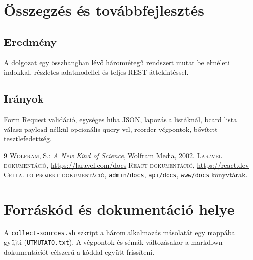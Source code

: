 \chapter{Összegzés és továbbfejlesztés}

\section{Eredmény}
A dolgozat egy összhangban lévő háromrétegű rendszert mutat be elméleti indokkal, részletes adatmodellel és teljes REST áttekintéssel.

\section{Irányok}
Form Request validáció, egységes hiba JSON, lapozás a listáknál, board lista válasz payload nélkül opcionális query-vel, reorder végpontok, bővített tesztlefedettség.

\begin{thebibliography}{9}
\textsc{Wolfram, S.}: \emph{A New Kind of Science}, Wolfram Media, 2002.
\textsc{Laravel dokumentáció}, \url{https://laravel.com/docs}
\textsc{React dokumentáció}, \url{https://react.dev}
\textsc{Cellauto projekt dokumentáció}, \texttt{admin/docs}, \texttt{api/docs}, \texttt{www/docs} könyvtárak.
\end{thebibliography}

\appendix
\chapter{Forráskód és dokumentáció helye}
A \texttt{collect-sources.sh} szkript a három alkalmazás másolatát egy mappába gyűjti (\texttt{UTMUTATO.txt}). A végpontok és sémák változásakor a markdown dokumentációt célszerű a kóddal együtt frissíteni.
